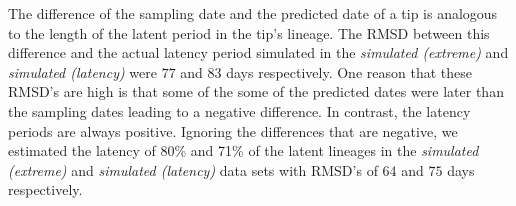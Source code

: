 \documentclass{bmcart}
\begin{document}
The difference of the sampling date and the predicted date of a tip is analogous to the length of the latent period in the tip's lineage.
The RMSD between this difference and the actual latency period simulated in the \emph{simulated (extreme)} and \emph{simulated (latency)} were $77$ and $83$ days respectively.
One reason that these RMSD's are high is that some of the some of the predicted dates were later than the sampling dates leading to a negative difference.
In contrast, the latency periods are always positive.
Ignoring the differences that are negative, we estimated the latency of 80\% and 71\% of the latent lineages in the \emph{simulated (extreme)} and \emph{simulated (latency)} data sets with RMSD's of $64$ and $75$ days respectively.



\end{document}
